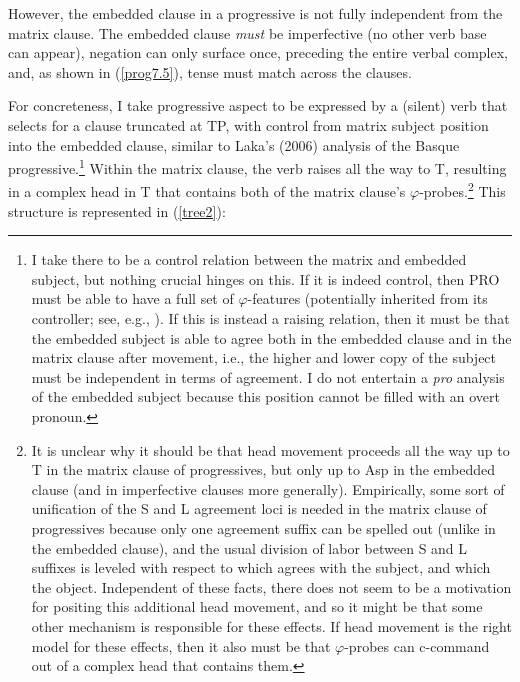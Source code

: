 \documentclass[output=paper
,modfonts
,nonflat]{langsci/langscibook}
\begin{document}
\z

\noindent However, the embedded clause in a progressive is not fully independent from the matrix clause. The embedded clause \textit{must} be imperfective (no other verb base can appear), negation can only surface once, preceding the entire verbal complex, and, as shown in (\ref{prog7.5}), tense must match across the clauses.

\eal \label{prog7.5}
\zl

For concreteness, I take progressive aspect to be expressed by a (silent) verb that selects for a clause truncated at TP, with control from matrix subject position into the embedded clause, similar to Laka's (2006) analysis of the Basque progressive.\footnote{I take there to be a control relation between the matrix and embedded subject, but nothing crucial hinges on this. If it is indeed control, then PRO must be able to have a full set of $\varphi$-features (potentially inherited from its controller; see, e.g., \citealt{Ussery08}). If this is instead a raising relation, then it must be that the embedded subject is able to agree both in the embedded clause and in the matrix clause after movement, i.e., the higher and lower copy of the subject must be independent in terms of agreement. I do not entertain a \textit{pro} analysis of the embedded subject because this position cannot be filled with an overt pronoun.} Within the matrix clause, the verb raises all the way to T, resulting in a complex head in T that contains both of the matrix clause's $\varphi$-probes.\footnote{It is unclear why it should be that head movement proceeds all the way up to T in the matrix clause of progressives, but only up to Asp in the embedded clause (and in imperfective clauses more generally). Empirically, some sort of unification of the S and L agreement loci is needed in the matrix clause of progressives because only one agreement suffix can be spelled out (unlike in the embedded clause), and the usual division of labor between S and L suffixes is leveled with respect to which agrees with the subject, and which the object. Independent of these facts, there does not seem to be a motivation for positing this additional head movement, and so it might be that some other mechanism is responsible for these effects. If head movement is the right model for these effects, then it also must be that $\varphi$-probes can c-command out of a complex head that contains them.} This structure is represented in (\ref{tree2}):\nocite{Laka06}
\end{document}
